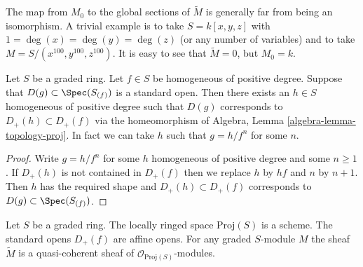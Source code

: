 \begin{remark}
\label{remark-global-sections-not-isomorphism}
The map from $M_0$ to the global sections of $\widetilde M$
is generally far from being an isomorphism. A trivial
example is to take $S = k[x, y, z]$ with $1 = \deg(x) = \deg(y) = \deg(z)$
(or any number of variables) and to take $M = S/(x^{100}, y^{100}, z^{100})$.
It is easy to see that $\widetilde M = 0$, but $M_0 = k$.
\end{remark}

\begin{lemma}
\label{lemma-standard-open-proj}
Let $S$ be a graded ring. Let $f \in S$ be homogeneous of positive degree.
Suppose that $D(g) \subset \Spec(S_{(f)})$ is a standard open.
Then there exists an $h \in S$ homogeneous of positive degree such that
$D(g)$ corresponds to $D_{+}(h) \subset D_{+}(f)$ via the homeomorphism
of Algebra, Lemma \ref{algebra-lemma-topology-proj}. In fact we can
take $h$ such that $g = h/f^n$ for some $n$.
\end{lemma}

\begin{proof}
Write $g = h/f^n$ for some $h$ homogeneous of positive degree
and some $n \geq 1$. If $D_{+}(h)$ is not contained in
$D_{+}(f)$ then we replace $h$ by $hf$ and $n$ by $n + 1$.
Then $h$ has the required shape and $D_{+}(h) \subset D_{+}(f)$
corresponds to $D(g) \subset \Spec(S_{(f)})$.
\end{proof}

\begin{lemma}
\label{lemma-proj-scheme}
Let $S$ be a graded ring.
The locally ringed space $\text{Proj}(S)$ is a scheme.
The standard opens $D_{+}(f)$ are affine opens.
For any graded $S$-module $M$ the sheaf
$\widetilde M$ is a quasi-coherent sheaf of
$\mathcal{O}_{\text{Proj}(S)}$-modules.
\end{lemma}

